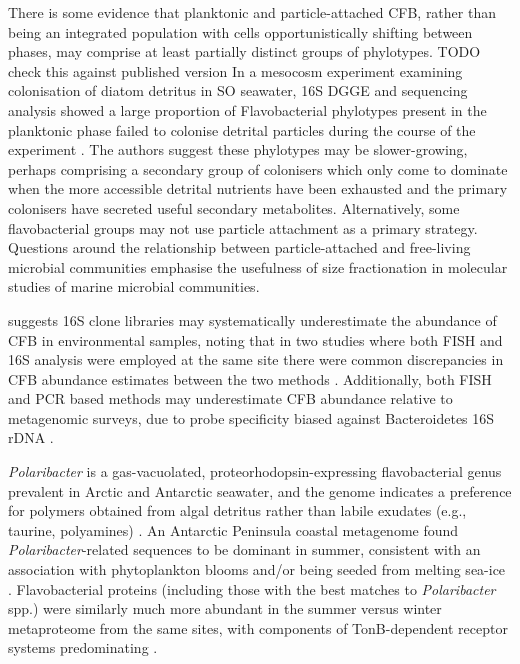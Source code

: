 There is some evidence that planktonic and particle-attached \ac{CFB}, rather than being an integrated population with cells opportunistically shifting between phases, may comprise at least partially distinct groups of phylotypes.
TODO check this against published version
In a mesocosm experiment examining colonisation of diatom detritus in \ac{SO} seawater, 16S \ac{DGGE} and sequencing analysis showed a large proportion of Flavobacterial phylotypes present in the planktonic phase failed to colonise detrital particles during the course of the experiment \cite{Abell:dh}.
The authors suggest these phylotypes may be slower-growing, perhaps comprising a secondary group of colonisers which only come to dominate when the more accessible detrital nutrients have been exhausted and the primary colonisers have secreted useful secondary metabolites.
Alternatively, some flavobacterial groups may not use particle attachment as a primary strategy.
Questions around the relationship between particle-attached and free-living microbial communities emphasise the usefulness of size fractionation in molecular studies of marine microbial communities.

\citet{Kirchman:2002ub} suggests 16S clone libraries may systematically underestimate the abundance of \ac{CFB} in environmental samples, noting that in two studies where both \ac{FISH} and 16S analysis were employed at the same site there were common discrepancies in \ac{CFB} abundance estimates between the two methods \cite{Cottrell:2000iq,Eilers:2000in}.
Additionally, both \ac{FISH} and PCR based methods may underestimate \ac{CFB} abundance relative to metagenomic surveys, due to probe specificity biased against Bacteroidetes 16S rDNA \cite{Cottrell:2005bo,OSullivan:2006km}.

\emph{Polaribacter} is a gas-vacuolated, proteorhodopsin-expressing flavobacterial genus prevalent in Arctic and Antarctic seawater, and the genome indicates a preference for polymers obtained from algal detritus rather than labile exudates (e.g., taurine, polyamines) \cite{Gonzalez:2008tn}.
An Antarctic Peninsula coastal metagenome found \emph{Polaribacter}-related sequences to be dominant in summer, consistent with an association with phytoplankton blooms and/or being seeded from melting sea-ice \cite{Grzymski:2012ej}.
Flavobacterial proteins (including those with the best matches to \emph{Polaribacter} spp.) were similarly much more abundant in the summer versus winter metaproteome from the same sites, with components of TonB-dependent receptor systems predominating \cite{Williams:2012bs}. 

